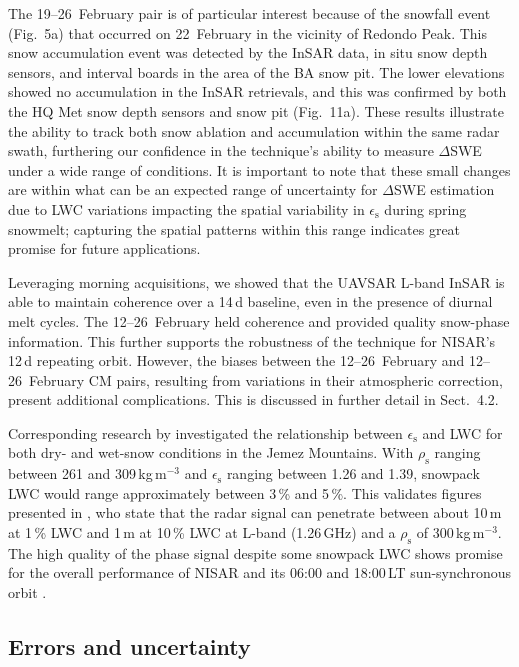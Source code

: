 The 19--26~February pair is of particular interest because of the snowfall event (Fig.~5a) that occurred on 22~February in the vicinity of Redondo Peak. This snow accumulation event was detected by the InSAR data, in situ snow depth sensors, and interval boards in the area of the BA snow pit. The lower elevations showed no accumulation in the InSAR retrievals, and this was confirmed by both the HQ Met snow depth sensors and snow pit (Fig.~11a). These results illustrate the ability to track both snow ablation and accumulation within the same radar swath, furthering our confidence in the technique's ability to measure $\Delta$SWE under a wide range of conditions. It is important to note that these small changes are within what can be an expected range of uncertainty for $\Delta$SWE estimation due to LWC variations impacting the spatial variability in $\epsilon_\mathrm{s}$ during spring snowmelt; capturing the spatial patterns within this range indicates great promise for future applications.


Leveraging morning acquisitions, we showed that the UAVSAR L-band InSAR is able to maintain coherence over a 14\,d baseline, even in the presence of diurnal melt cycles. The 12--26~February held coherence and provided quality snow-phase information. This further supports the robustness of the technique for NISAR's 12\,d repeating orbit. However, the biases between the 12--26~February and 12--26~February CM pairs, resulting from variations in their atmospheric correction, present additional complications. This is discussed in further detail in Sect.~4.2.

Corresponding research by \citet{webbSituDeterminationDry2021} investigated the relationship between $\epsilon_\mathrm{s}$ and LWC for both dry- and wet-snow conditions in the Jemez Mountains. With $\rho_\mathrm{s}$ ranging between 261 and 309\,kg\,m$^{-3}$ and $\epsilon_\mathrm{s}$ ranging between 1.26 and 1.39, snowpack LWC would range approximately between 3\,\% and 5\,\%. This validates figures presented in \citet{leinssSnowWaterEquivalent2015}, who state that the radar signal can penetrate between about 10\,m at 1\,\% LWC and 1\,m at 10\,\% LWC at L-band (1.26\,GHz) and a $\rho_\mathrm{s}$ of 300\,kg\,m$^{-3}$. The high quality of the phase signal despite some snowpack LWC shows promise for the overall performance of NISAR and its 06:00 and 18:00\,LT sun-synchronous orbit \citep{webbSituDeterminationDry2021,bonnellSpatiotemporalVariationsLiquid2021}.

\hypertarget{ch4-discussion-2}{\subsection{Errors and uncertainty}\label{ch4-discussion-2}}

